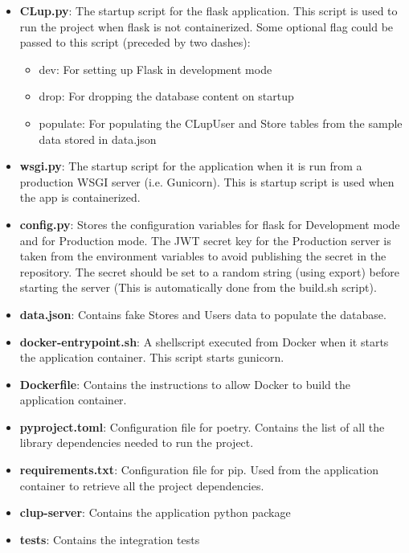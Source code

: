 \begin{itemize}
    \item \textbf{CLup.py}: The startup script for the flask application. This script is used to run the project when flask is not containerized. Some optional flag could be passed to this script (preceded by two dashes):
          \begin{itemize}
              \item dev:  For setting up Flask in development mode
              \item drop: For dropping the database content on startup
              \item populate: For populating the CLupUser and Store tables from the sample data stored in data.json
          \end{itemize}
    \item \textbf{wsgi.py}: The startup script for the application when it is run from a production WSGI server (i.e. Gunicorn). This is startup script is used when the app is containerized.
    \item \textbf{config.py}: Stores the configuration variables for flask for Development mode and for Production mode. The JWT secret key for the Production server is taken from the environment variables to avoid publishing the secret in the repository. The secret should be set to a random string (using export) before starting the server (This is automatically done from the build.sh script).
    \item \textbf{data.json}: Contains fake Stores and Users data to populate the database.
    \item \textbf{docker-entrypoint.sh}: A shellscript executed from Docker when it starts the application container. This script starts gunicorn.
    \item \textbf{Dockerfile}: Contains the instructions to allow Docker to build the application container.
    \item \textbf{pyproject.toml}: Configuration file for poetry. Contains the list of all the library dependencies needed to run the project.
    \item \textbf{requirements.txt}: Configuration file for pip. Used from the application container to retrieve all the project dependencies.
    \item \textbf{clup-server}: Contains the application python package
    \item \textbf{tests}: Contains the integration tests
\end{itemize}

